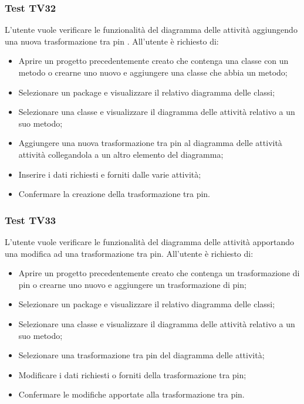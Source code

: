 \documentclass[../PianoDiQualifica.tex]{subfiles}
\begin{document}
	\subsubsection{Test TV32} 
	L'utente vuole verificare le funzionalità del diagramma delle attività aggiungendo una nuova trasformazione tra pin . 
	All'utente è richiesto di: 
	\begin{itemize} 
		\item Aprire un progetto precedentemente creato che contenga una classe con un metodo o crearne uno nuovo e aggiungere una classe che abbia un metodo;
		\item Selezionare un package e visualizzare il relativo diagramma delle classi; 
		\item Selezionare una classe e visualizzare il diagramma delle attività relativo a un suo metodo; %
		\item Aggiungere una nuova trasformazione tra pin al diagramma delle attività attività collegandola a un altro elemento del diagramma; 
		\item Inserire i dati richiesti e forniti dalle varie attività;
		\item Confermare la creazione della trasformazione tra pin.%
	\end{itemize} 
	
	\subsubsection{Test TV33} 
	L'utente vuole verificare le funzionalità del diagramma delle attività apportando una modifica ad una trasformazione tra pin. 
	All'utente è richiesto di: 
	\begin{itemize} 
		\item Aprire un progetto precedentemente creato che contenga un trasformazione di pin o crearne uno nuovo e aggiungere un trasformazione di pin;
		\item Selezionare un package e visualizzare il relativo diagramma delle classi; 
		\item Selezionare una classe e visualizzare il diagramma delle attività relativo a un suo metodo; 
		\item Selezionare una trasformazione tra pin del diagramma delle attività;
		\item Modificare i dati richiesti o forniti della trasformazione tra pin;%
		\item Confermare le modifiche apportate alla trasformazione tra pin. 
	\end{itemize} 
	
\end{document}

